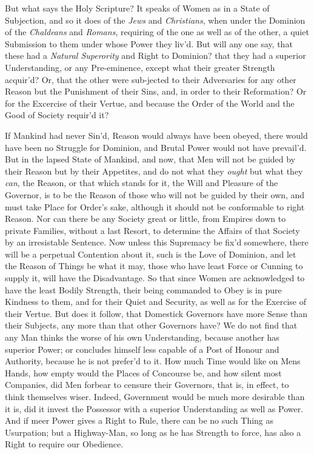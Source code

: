 But what says the Holy Scripture? It speaks of Women as in a State of
Subjection, and so it does of the \textit{Jews} and
\textit{Christians}, when under the Dominion of the \textit{Chaldeans}
and \textit{Romans}, requiring of the one as well as of the other, a
quiet Submission to them under whose Power they liv'd. But will any
one say, that these had a \textit{Natural Superority} and Right to
Dominion? that they had a superior Understanding, or any Pre-eminence,
except what their greater Strength acquir'd? Or, that the other were
sub-jected to their Adversaries for any other Reason but the
Punishment of their Sins, and, in order to their Reformation? Or for
the Excercise of their Vertue, and because the Order of the World and
the Good of Society requir'd it?

If Mankind had never Sin'd, Reason would always have been obeyed,
there would have been no Struggle for Dominion, and Brutal Power would
not have prevail'd. But in the lapsed State of Mankind, and now, that
Men will not be guided by their Reason but by their Appetites, and do
not what they \textit{ought} but what they \textit{can}, the Reason,
or that which stands for it, the Will and Pleasure of the Governor, is
to be the Reason of those who will not be guided by their own, and
must take Place for Order's sake, although it should not be
conformable to right Reason. Nor can there be any Society great or
little, from Empires down to private Families, without a last Resort,
to determine the Affairs of  that Society by an irresistable
Sentence. Now unless this Supremacy be fix'd somewhere, there will be
a perpetual Contention about it, such is the Love of Dominion, and
let the Reason of Things be what it may, those who have least Force or
Cunning to supply it, will have the Disadvantage. So that since Women
are acknowledged to have the least Bodily Strength, their being
commanded to Obey is in pure Kindness to them, and for their Quiet
and Security, as well as for the Exercise of their Vertue. But does it
follow, that Domestick Governors have more Sense than their Subjects,
any more than that other Governors have? We do not find that any Man
thinks the worse of his own Understanding, because another has
superior Power; or concludes himself less capable of a Post of Honour
and Authority, because he is not prefer'd to it. How much Time would
like on Mens Hands, how empty would the Places of Concourse be, and
how silent most Companies, did  Men forbear to censure their
Governors, that is, in effect, to think themselves wiser. Indeed,
Government would be much more desirable than it is, did it invest
the Possessor with a superior Understanding as well as Power. And if
meer Power gives a Right to Rule, there can be no such Thing as
Usurpation; but a Highway-Man, so long as he has Strength to force,
has also a Right to require our Obedience.

